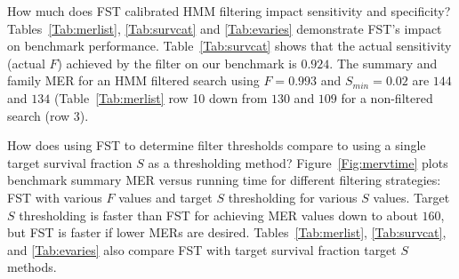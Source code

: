 How much does FST calibrated HMM filtering impact sensitivity and
specificity?  Tables~\ref{Tab:merlist}, \ref{Tab:survcat} and
\ref{Tab:evaries} demonstrate FST's impact on benchmark performance.
Table~\ref{Tab:survcat} shows that the actual sensitivity (actual $F$)
achieved by the filter on our benchmark is $0.924$. The summary and
family MER for an HMM filtered search using $F=0.993$ and
$S_{min}=0.02$ are $144$ and $134$ (Table~\ref{Tab:merlist} row 10
down from $130$ and $109$ for a non-filtered search (row 3).

How does using FST to determine filter thresholds compare to using a
single target survival fraction $S$ as a thresholding method?
Figure~\ref{Fig:mervtime} plots benchmark summary MER versus running
time for different filtering strategies: FST with various $F$ values
and target $S$ thresholding for various $S$ values. Target $S$
thresholding is faster than FST for achieving MER values down to about
$160$, but FST is faster if lower MERs are desired.
Tables~\ref{Tab:merlist}, \ref{Tab:survcat}, and \ref{Tab:evaries}
also compare FST with target survival fraction target $S$ methods.

\begin{comment}
FST outperforms all possible single predicted survival fraction $S$ thresholds for HMM
filtering. No single threshold yields both faster and more sensitive
benchmark results than does FST (Figure~\ref{Fig:03}). The target $S$ cutoff
that most closely mirrors FST is X. Figure Z also shows the
performance of a HMM filtered run that uses thresholds that give
predicted survival fractions of 0.01 (``S=0.01'' point); which is also
very close to FST. Using an HMM threshold that yields a survival
fraction of $0.01$ was put forth by \citet{WeinbergRuzzo06} as a good
compromise between speed and sensitivity and our results support their
findings when a single threshold is used.

It is only possible for FST to outperform all single E-value
thresholds because it sets HMM thresholds in a model-specific manner. 
FST determines that an HMM filter is very effective for some models
and sets those thresholds high, and for models where an HMM filter is
less effective, the threshold must be set lower to achieve the target
sensitivity. Table X breaks down the 51 benchmark families into groups
based on the predicted survival fraction from an FST calibrated HMM
filter with $F=0.99$. The benchmark statistics for each group are compared against
the most closely performing single value HMM filter threshold of X.
In general, FST correctly determines the appropriate HMM filter
threshold per family to maintain sensitivity while maximizing
acceleration. 
\end{comment}

